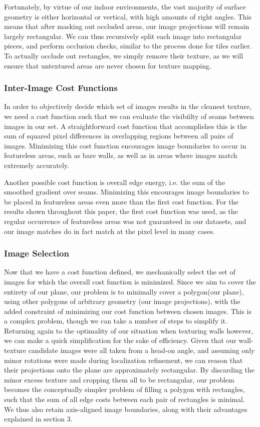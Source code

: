 \documentclass[10pt,twocolumn,letterpaper]{article}
\begin{document}
Fortunately, by virtue of our indoor environments, the vast majority
of surface geometry is either horizontal or vertical, with high
amounts of right angles. This means that after masking out occluded
areas, our image projections will remain largely rectangular. We can
thus recursively split each image into rectangular pieces, and perform
occlusion checks, similar to the process done for tiles earlier. To
actually occlude out rectangles, we simply remove their texture, as we
will ensure that untextured areas are never chosen for texture
mapping.

\subsubsection{Inter-Image Cost Functions}
In order to objectively decide which set of images results in the
cleanest texture, we need a cost function such that we can evaluate
the visibiilty of seams between images in our set. A straightforward
cost function that accomplishes this is the sum of squared pixel
differences in overlapping regions between all pairs of
images. Minimizing this cost function encourages image boundaries to
occur in featureless areas, such as bare walls, as well as in areas
where images match extremely accurately.

Another possible cost function is overall edge energy, i.e. the sum of
the smoothed gradient over seams. Minimizing this encourages image
boundaries to be placed in featureless areas even more than the first
cost function. For the results shown throughout this paper, the first
cost function was used, as the regular occurrence of featureless areas
was not guaranteed in our datasets, and our image matches do in fact
match at the pixel level in many cases.

\subsubsection{Image Selection}

Now that we have a cost function defined, we mechanically select the
set of images for which the overall cost function is minimized. Since
we aim to cover the entirety of our plane, our problem is to minimally
cover a polygon(our plane), using other polygons of arbitrary geometry
(our image projections), with the added constraint of minimizing our
cost function between chosen images. This is a complex problem, though
we can take a number of steps to simplify it. Returning again to the
optimality of our situation when texturing walls however, we can make
a quick simplification for the sake of efficiency. Given that our
wall-texture candidate images were all taken from a head-on angle, and
assuming only minor rotations were made during localization
refinement, we can reason that their projections onto the plane are
approximately rectangular. By discarding the minor excess texture and
cropping them all to be rectangular, our problem becomes the
conceptually simpler problem of filling a polygon with rectangles,
such that the sum of all edge costs between each pair of rectangles is
minimal. We thus also retain axis-aligned image boundaries, along with
their advantages explained in section 3.
\end{document}

